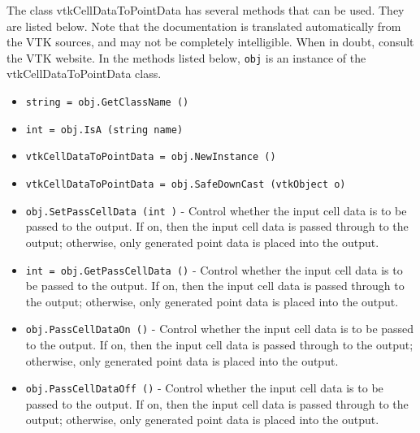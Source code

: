The class vtkCellDataToPointData has several methods that can be used.
  They are listed below.
Note that the documentation is translated automatically from the VTK sources,
and may not be completely intelligible.  When in doubt, consult the VTK website.
In the methods listed below, \verb|obj| is an instance of the vtkCellDataToPointData class.
\begin{itemize}
\item  \verb|string = obj.GetClassName ()|

\item  \verb|int = obj.IsA (string name)|

\item  \verb|vtkCellDataToPointData = obj.NewInstance ()|

\item  \verb|vtkCellDataToPointData = obj.SafeDownCast (vtkObject o)|

\item  \verb|obj.SetPassCellData (int )| -  Control whether the input cell data is to be passed to the output. If
 on, then the input cell data is passed through to the output; otherwise,
 only generated point data is placed into the output.

\item  \verb|int = obj.GetPassCellData ()| -  Control whether the input cell data is to be passed to the output. If
 on, then the input cell data is passed through to the output; otherwise,
 only generated point data is placed into the output.

\item  \verb|obj.PassCellDataOn ()| -  Control whether the input cell data is to be passed to the output. If
 on, then the input cell data is passed through to the output; otherwise,
 only generated point data is placed into the output.

\item  \verb|obj.PassCellDataOff ()| -  Control whether the input cell data is to be passed to the output. If
 on, then the input cell data is passed through to the output; otherwise,
 only generated point data is placed into the output.

\end{itemize}
